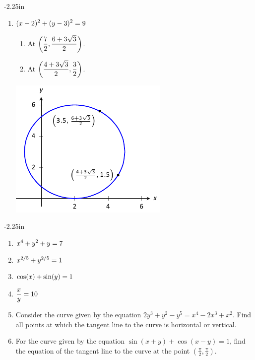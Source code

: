 \begin{adjustwidth*}{}{-2.25in}
\begin{multicols*}{2}
\begin{enumerate}[1),resume]
\item $\displaystyle (x-2)^2+(y-3)^2=9$
\begin{enumerate}
\item	At $\displaystyle \left(\frac72,\frac{6+3\sqrt{3}}{2}\right)$.
\item	At $\displaystyle\left(\frac{4+3\sqrt{3}}{2}, \frac32\right)$.
\end{enumerate}
\includegraphics[scale=.8]{figures/fig02_06_ex_27}
\end{enumerate}

\end{multicols*}
\end{adjustwidth*}

\clearpage

\begin{adjustwidth*}{}{-2.25in}
\setlength{\columnsep}{25pt}
\begin{multicols*}{2}\small


\begin{enumerate}[1),start=23]
\item $\displaystyle x^4+y^2+y=7$
\item $\displaystyle x^{2/5}+y^{2/5}=1$
\item $\displaystyle \cos (x)+\sin (y)=1$
\item $\displaystyle \frac{x}{y}=10$

\item Consider the curve given by the equation $2y^3+y^2-y^5 = x^4 - 2x^3  + x^2$.  Find all points at which the tangent line to the curve is horizontal or vertical.

\item For the curve given by the equation $\sin(x+y) + \cos(x-y) = 1$, find the equation of the tangent line to the curve at the point $(\frac{\pi}{2}, \frac{\pi}{2})$.
\end{enumerate}

\end{multicols*}
\end{adjustwidth*}

\afterexercises